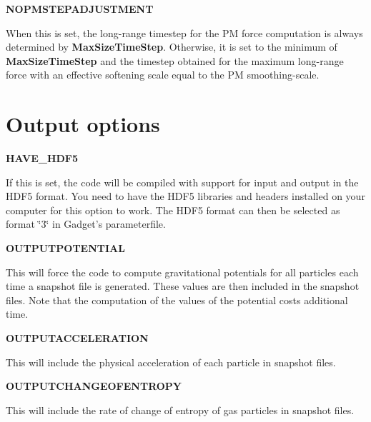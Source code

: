 \begin{DoxyItemize}
\item {\bfseries \-N\-O\-P\-M\-S\-T\-E\-P\-A\-D\-J\-U\-S\-T\-M\-E\-N\-T} \par
 \-When this is set, the long-\/range timestep for the \-P\-M force computation is always determined by {\bfseries \-Max\-Size\-Time\-Step}. \-Otherwise, it is set to the minimum of {\bfseries \-Max\-Size\-Time\-Step} and the timestep obtained for the maximum long-\/range force with an effective softening scale equal to the \-P\-M smoothing-\/scale.
\end{DoxyItemize}

\par
 \hypertarget{Gadget-Makefile_secmake6}{}\section{\-Output options}\label{Gadget-Makefile_secmake6}

\begin{DoxyItemize}
\item {\bfseries \-H\-A\-V\-E\-\_\-\-H\-D\-F5} \par
 \-If this is set, the code will be compiled with support for input and output in the \-H\-D\-F5 format. \-You need to have the \-H\-D\-F5 libraries and headers installed on your computer for this option to work. \-The \-H\-D\-F5 format can then be selected as format \char`\"{}3\char`\"{} in \-Gadget's parameterfile.
\end{DoxyItemize}


\begin{DoxyItemize}
\item {\bfseries \-O\-U\-T\-P\-U\-T\-P\-O\-T\-E\-N\-T\-I\-A\-L} \par
 \-This will force the code to compute gravitational potentials for all particles each time a snapshot file is generated. \-These values are then included in the snapshot files. \-Note that the computation of the values of the potential costs additional time.
\end{DoxyItemize}


\begin{DoxyItemize}
\item {\bfseries \-O\-U\-T\-P\-U\-T\-A\-C\-C\-E\-L\-E\-R\-A\-T\-I\-O\-N} \par
 \-This will include the physical acceleration of each particle in snapshot files.
\end{DoxyItemize}


\begin{DoxyItemize}
\item {\bfseries \-O\-U\-T\-P\-U\-T\-C\-H\-A\-N\-G\-E\-O\-F\-E\-N\-T\-R\-O\-P\-Y} \par
 \-This will include the rate of change of entropy of gas particles in snapshot files.
\end{DoxyItemize}


